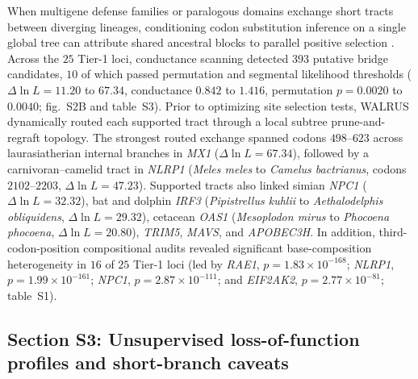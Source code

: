 \documentclass[12pt]{article}
\begin{document}
When multigene defense families or paralogous domains exchange short tracts between diverging lineages, conditioning codon substitution inference on a single global tree can attribute shared ancestral blocks to parallel positive selection \cite{pond2006gard,kosakovsky2021contrast}. Across the $25$ Tier-1 loci, conductance scanning detected $393$ putative bridge candidates, $10$ of which passed permutation and segmental likelihood thresholds ($\Delta \ln L = 11.20$ to $67.34$, conductance $0.842$ to $1.416$, permutation $p = 0.0020$ to $0.0040$; fig.~S2B and table~S3). Prior to optimizing site selection tests, WALRUS dynamically routed each supported tract through a local subtree prune-and-regraft topology. The strongest routed exchange spanned codons $498$--$623$ across laurasiatherian internal branches in \textit{MX1} ($\Delta \ln L = 67.34$), followed by a carnivoran--camelid tract in \textit{NLRP1} (\textit{Meles meles} to \textit{Camelus bactrianus}, codons $2102$--$2203$, $\Delta \ln L = 47.23$). Supported tracts also linked simian \textit{NPC1} ($\Delta \ln L = 32.32$), bat and dolphin \textit{IRF3} (\textit{Pipistrellus kuhlii} to \textit{Aethalodelphis obliquidens}, $\Delta \ln L = 29.32$), cetacean \textit{OAS1} (\textit{Mesoplodon mirus} to \textit{Phocoena phocoena}, $\Delta \ln L = 20.80$), \textit{TRIM5}, \textit{MAVS}, and \textit{APOBEC3H}. In addition, third-codon-position compositional audits revealed significant base-composition heterogeneity in $16$ of $25$ Tier-1 loci (led by \textit{RAE1}, $p = 1.83 \times 10^{-168}$; \textit{NLRP1}, $p = 1.99 \times 10^{-161}$; \textit{NPC1}, $p = 2.87 \times 10^{-111}$; and \textit{EIF2AK2}, $p = 2.77 \times 10^{-81}$; table~S1).

\subsection*{Section S3: Unsupervised loss-of-function profiles and short-branch caveats}
\end{document}
